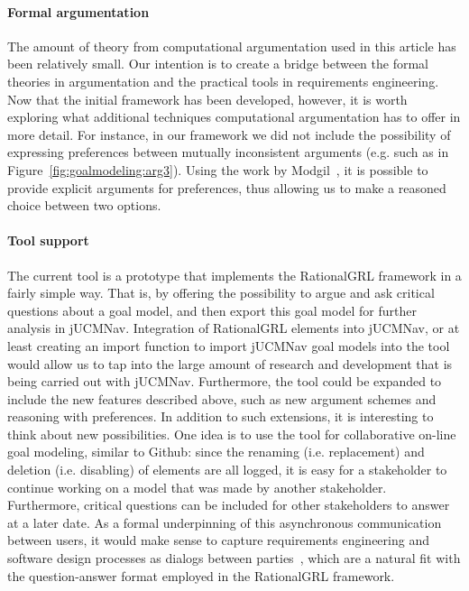 \paragraph{Formal argumentation}
The amount of theory from computational argumentation used in this article has been relatively small. Our intention is to create a bridge between the formal theories in argumentation and the practical tools in requirements engineering. Now that the initial framework has been developed, however, it is worth exploring what additional techniques computational argumentation has to offer in more detail. For instance, in our framework we did not include the possibility of expressing preferences between mutually inconsistent arguments (e.g. such as in Figure~\ref{fig:goalmodeling:arg3}). Using the work by Modgil~\cite{modgil2009}, it is possible to provide explicit arguments for preferences, thus allowing us to make a reasoned choice between two options. 

\paragraph{Tool support}
The current tool is a prototype that implements the RationalGRL framework in a fairly simple way. That is, by offering the possibility to argue and ask critical questions about a goal model, and then export this goal model for further analysis in jUCMNav. Integration of RationalGRL elements into jUCMNav, or at least creating an import function to import jUCMNav goal models into the tool would allow us to tap into the large amount of research and development that is being carried out with jUCMNav. Furthermore, the tool could be expanded to include the new features described above, such as new argument schemes and reasoning with preferences. In addition to such extensions, it is interesting to think about new possibilities. One idea is to use the tool for collaborative on-line goal modeling, similar to Github: since the renaming (i.e. replacement) and deletion (i.e. disabling) of elements are all logged, it is easy for a stakeholder to continue working on a model that was made by another stakeholder. Furthermore, critical questions can be included for other stakeholders to answer at a later date. As a formal underpinning of this asynchronous communication between users, it would make sense to capture requirements engineering and software design processes as dialogs between parties~\cite{finkelstein1989multiparty,BlackEtal2013}, which are a natural fit with the question-answer format employed in the RationalGRL framework. 

